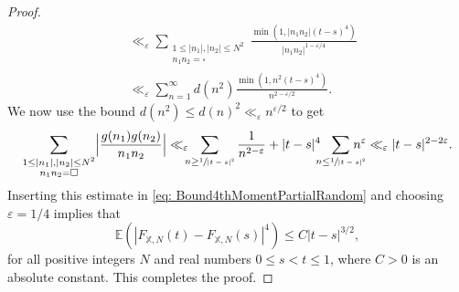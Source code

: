 \documentclass[10pt]{amsart}
\theoremstyle{plain}
\theoremstyle{definition}
\let\ep\varepsilon
\newcommand{\X}{\mathbb{X}}
\newcommand{\ex}{\mathbb{E}}
\begin{document}
\begin{proof}
\begin{align*}
&\ll_{\ep} \sum_{\substack{1\leq |n_1|, |n_2|\leq N^2\\ n_1n_2=\square}} \frac{\min(1, |n_1n_2|(t-s)^4)}{|n_1n_2|^{1-\ep/4}}\\
&\ll_{\ep} \sum_{n=1}^{\infty} d(n^2)\frac{\min(1, n^2(t-s)^4)}{n^{2-\ep/2}}.
\end{align*}
We now use the bound $d(n^2)\leq d(n)^2\ll_{\ep} n^{\ep/2}$ to get
\begin{equation}\label{BoundsGSum}
\sum_{\substack{1\leq |n_1|, |n_2|\leq N^2\\ n_1n_2=\square}} \Bigl|\frac{g(n_1)g(n_2)}{n_1n_2}\Bigr|
\ll_{\ep}\hspace*{-2mm}
\sum_{n \geq \sfrac{1}{|t-s|^2}} \frac{1}{n^{2-\ep}} + |t-s|^4\hspace*{-2mm}\sum_{n \leq \sfrac{1}{|t-s|^2}}\hspace*{-4mm} n^{\ep}
\ll_{\ep} |t-s|^{2-2\ep}.
\end{equation}
Inserting this estimate in \eqref{eq: Bound4thMomentPartialRandom} and choosing $\ep=1/4$ implies that
\[\ex\left(\left|F_{\X, N}(t)-F_{\X, N}(s)\right|^{4}\right)\leq C |t-s|^{3/2},\]
for all positive integers $N$ and real numbers $0\leq s<t\leq 1$, where $C>0$ is an absolute constant. This completes the proof.
\end{proof}
\end{document}
